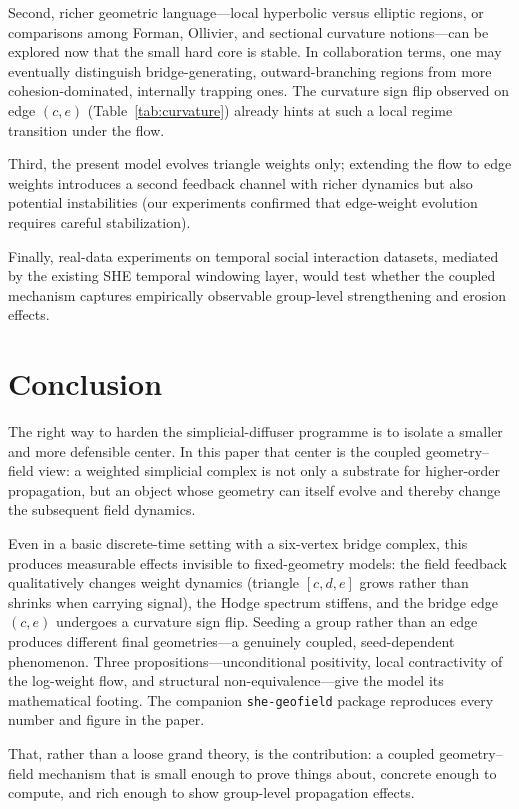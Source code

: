 \documentclass[11pt]{article}
\begin{document}
Second, richer geometric language---local hyperbolic versus elliptic regions, or comparisons among Forman, Ollivier, and sectional curvature notions---can be explored now that the small hard core is stable. In collaboration terms, one may eventually distinguish bridge-generating, outward-branching regions from more cohesion-dominated, internally trapping ones. The curvature sign flip observed on edge $(c,e)$ (Table~\ref{tab:curvature}) already hints at such a local regime transition under the flow.

Third, the present model evolves triangle weights only; extending the flow to edge weights introduces a second feedback channel with richer dynamics but also potential instabilities (our experiments confirmed that edge-weight evolution requires careful stabilization).

Finally, real-data experiments on temporal social interaction datasets, mediated by the existing SHE temporal windowing layer, would test whether the coupled mechanism captures empirically observable group-level strengthening and erosion effects.

\section{Conclusion}

The right way to harden the simplicial-diffuser programme is to isolate a smaller and more defensible center.  In this paper that center is the coupled geometry--field view: a weighted simplicial complex is not only a substrate for higher-order propagation, but an object whose geometry can itself evolve and thereby change the subsequent field dynamics.

Even in a basic discrete-time setting with a six-vertex bridge complex, this produces measurable effects invisible to fixed-geometry models: the field feedback qualitatively changes weight dynamics (triangle $[c,d,e]$ grows rather than shrinks when carrying signal), the Hodge spectrum stiffens, and the bridge edge $(c,e)$ undergoes a curvature sign flip.  Seeding a group rather than an edge produces different final geometries---a genuinely coupled, seed-dependent phenomenon.  Three propositions---unconditional positivity, local contractivity of the log-weight flow, and structural non-equivalence---give the model its mathematical footing.  The companion \texttt{she-geofield} package reproduces every number and figure in the paper.

That, rather than a loose grand theory, is the contribution: a coupled geometry--field mechanism that is small enough to prove things about, concrete enough to compute, and rich enough to show group-level propagation effects.
\end{document}
